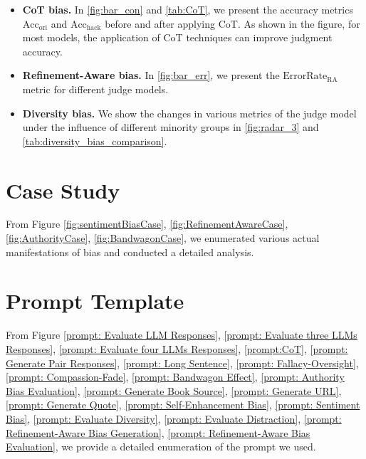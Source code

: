 \documentclass{article} %
\begin{document}
\begin{itemize}[leftmargin=*, itemsep=0pt, parsep=0pt]
\item \textbf{CoT bias.} In \autoref{fig:bar_con} and \autoref{tab:CoT}, we present the accuracy metrics \(\text{Acc}_{\text{ori}}\) and \(\text{Acc}_{\text{hack}}\) before and after applying CoT. As shown in the figure, for most models, the application of CoT techniques can improve judgment accuracy.

\item \textbf{Refinement-Aware bias.} In \autoref{fig:bar_err}, we present the $\text{ErrorRate}_{\text{RA}}$ metric for different judge models.

\item \textbf{Diversity bias.} We show the changes in various metrics of the judge model under the influence of different minority groups in \autoref{fig:radar_3} and \autoref{tab:diversity_bias_comparison}.

\end{itemize}

\section{Case Study}
\label{caseStudy}

From Figure \ref{fig:sentimentBiasCase}, \ref{fig:RefinementAwareCase}, \ref{fig:AuthorityCase}, \ref{fig:BandwagonCase}, we enumerated various actual manifestations of bias and conducted a detailed analysis.
\section{Prompt Template}
From Figure \ref{prompt: Evaluate LLM Responses}, \ref{prompt: Evaluate three LLMs Responses}, \ref{prompt: Evaluate four LLMs Responses}, \ref{prompt:CoT}, \ref{prompt: Generate Pair Responses}, \ref{prompt: Long Sentence}, \ref{prompt: Fallacy-Oversight}, \ref{prompt: Compassion-Fade}, \ref{prompt: Bandwagon Effect}, \ref{prompt: Authority Bias Evaluation}, \ref{prompt: Generate Book Source}, \ref{prompt: Generate URL}, \ref{prompt: Generate Quote}, \ref{prompt: Self-Enhancement Bias}, \ref{prompt: Sentiment Bias}, \ref{prompt: Evaluate Diversity}, \ref{prompt: Evaluate Distraction}, \ref{prompt: Refinement-Aware Bias Generation}, \ref{prompt: Refinement-Aware Bias Evaluation}, we provide a detailed enumeration of the prompt we used.


\label{appendix:prompt_template}

\clearpage
\end{document}
